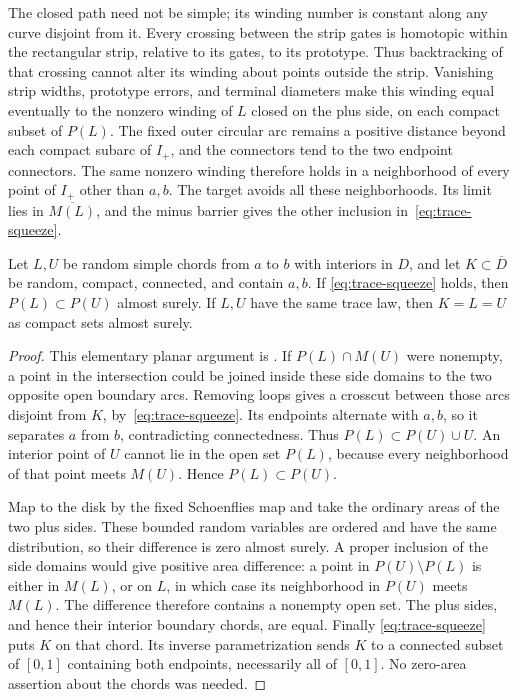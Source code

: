 The closed path need not be simple; its winding number is constant
along any curve disjoint from it.  Every crossing between the strip gates is homotopic within the
rectangular strip, relative to its gates, to its prototype.  Thus
backtracking of that crossing cannot alter its winding about points
outside the strip.  Vanishing strip widths, prototype errors, and
terminal diameters make this winding equal eventually to the nonzero
winding of $L$ closed on the plus side, on each compact subset of
$P(L)$.  The fixed outer circular arc remains a positive distance
beyond each compact subarc of $I_+$, and the connectors tend to the
two endpoint connectors.  The same nonzero winding therefore holds
in a neighborhood of every point of $I_+$ other than $a,b$.
The target avoids all these neighborhoods.  Its limit lies in
$\overline{M(L)}$, and the minus barrier gives the other inclusion
in~\eqref{eq:trace-squeeze}.

\begin{lemma}
\label{lem:ordered-chords}
Let $L,U$ be random simple chords from $a$ to $b$ with interiors in
$D$, and let $K\subset\overline D$ be random, compact, connected,
and contain $a,b$.  If \eqref{eq:trace-squeeze} holds, then
$P(L)\subset P(U)$ almost surely.  If $L,U$ have the same trace law,
then $K=L=U$ as compact sets almost surely.
\end{lemma}

\begin{proof}
This elementary planar argument is
\cite[Section~7, Lemma ``Ordered chords with equal laws'']{S}.
If $P(L)\cap M(U)$ were nonempty, a point in the intersection could
be joined inside these side domains to the two opposite open boundary
arcs.  Removing loops gives a crosscut between those arcs disjoint
from $K$, by~\eqref{eq:trace-squeeze}.  Its endpoints alternate
with $a,b$, so it separates $a$ from $b$, contradicting connectedness.
Thus $P(L)\subset P(U)\cup U$.  An interior point of $U$ cannot
lie in the open set $P(L)$, because every neighborhood of that point
meets $M(U)$.  Hence $P(L)\subset P(U)$.

Map to the disk by the fixed Schoenflies map and take the ordinary
areas of the two plus sides.  These bounded random variables are
ordered and have the same distribution, so their difference is zero
almost surely.  A proper inclusion of the side domains would give
positive area difference: a point in $P(U)\setminus P(L)$ is either
in $M(L)$, or on $L$, in which case its neighborhood in $P(U)$ meets
$M(L)$.  The difference therefore contains a nonempty open set.
The plus sides, and hence their interior boundary chords, are equal.
Finally \eqref{eq:trace-squeeze} puts $K$ on that chord.  Its inverse
parametrization sends $K$ to a connected subset of $[0,1]$ containing
both endpoints, necessarily all of $[0,1]$.  No zero-area assertion
about the chords was needed.
\end{proof}

